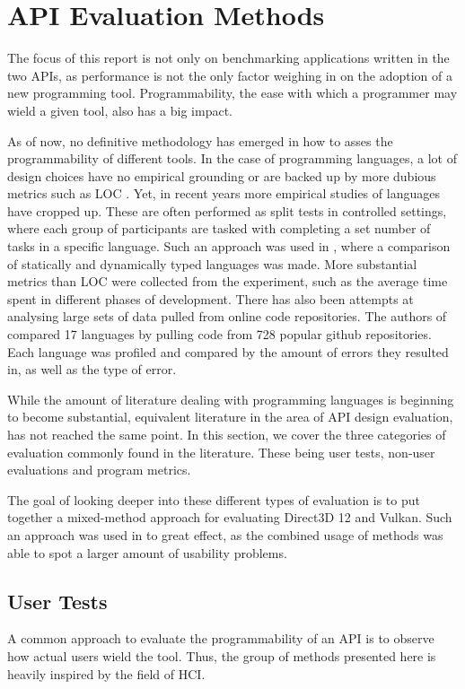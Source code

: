 \section{\gls{API} Evaluation Methods}\label{sec:apimethods}
The focus of this report is not only on benchmarking applications written in the two \glspl{API}, as performance is not the only factor weighing in on the adoption of a new programming tool.
Programmability, the ease with which a programmer may wield a given tool, also has a big impact.

As of now, no definitive methodology has emerged in how to asses the programmability of different tools.
In the case of programming languages, a lot of design choices have no empirical grounding or are backed up by more dubious metrics such as \gls{LOC} \cite{markstrum2010staking}.
Yet, in recent years more empirical studies of languages have cropped up.
These are often performed as split tests in controlled settings, where each group of participants are tasked with completing a set number of tasks in a specific language.
Such an approach was used in \cite{hanenberg2010experiment}, where a comparison of statically and dynamically typed languages was made.
More substantial metrics than \gls{LOC} were collected from the experiment, such as the average time spent in different phases of development.
There has also been attempts at analysing large sets of data pulled from online code repositories.
The authors of \cite{ray2014large} compared 17 languages by pulling code from 728 popular github repositories.
Each language was profiled and compared by the amount of errors they resulted in, as well as the type of error.

While the amount of literature dealing with programming languages is beginning to become substantial, equivalent literature in the area of \gls{API} design evaluation, has not reached the same point.
In this section, we cover the three categories of evaluation commonly found in the literature.
These being user tests, non-user evaluations and program metrics.     

The goal of looking deeper into these different types of evaluation is to put together a mixed-method approach for evaluating Direct3D 12 and Vulkan.
Such an approach was used in \cite{grill2012methods}\cite{beaton2008usability} to great effect, as the combined usage of methods was able to spot a larger amount of usability problems.

\subsection{User Tests}
A common approach to evaluate the programmability of an \gls{API} is to observe how actual users wield the tool.
Thus, the group of methods presented here is heavily inspired by the field of \gls{HCI}.

